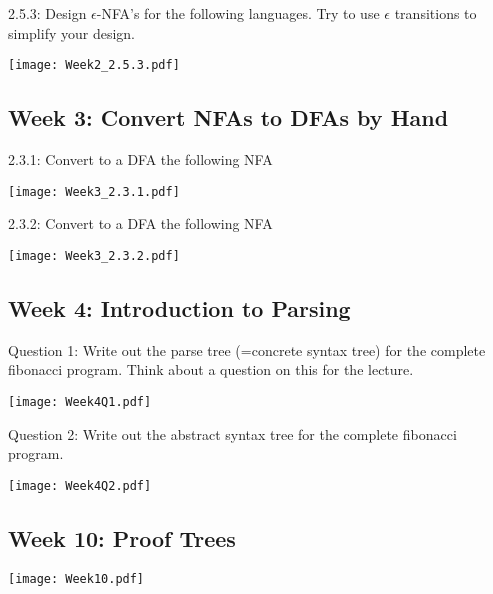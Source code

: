 \documentclass{article}
\theoremstyle{theorem}
\theoremstyle{definition}
\theoremstyle{remark}
\begin{document}
2.5.3: Design  $\epsilon$-NFA's for the following languages. Try to use $\epsilon$ transitions to simplify your design. 
\medskip\begin{center}
\texttt{[image: Week2\_2.5.3.pdf]}
\end{center}


\subsection{Week 3: Convert NFAs to DFAs by Hand}
2.3.1: Convert to a DFA the following NFA
\medskip\begin{center}
\texttt{[image: Week3\_2.3.1.pdf]}
\end{center}
2.3.2: Convert to a DFA the following NFA
\medskip\begin{center}
\texttt{[image: Week3\_2.3.2.pdf]}
\end{center}


\subsection{Week 4: Introduction to Parsing}
Question 1: Write out the parse tree (=concrete syntax tree) for the complete fibonacci program. Think about a question on this for the lecture.
\medskip\begin{center}
\texttt{[image: Week4Q1.pdf]}
\end{center}
Question 2: Write out the abstract syntax tree for the complete fibonacci program. 
\medskip\begin{center}
\texttt{[image: Week4Q2.pdf]}
\end{center}

\subsection{Week 10: Proof Trees}
\medskip\begin{center}
\texttt{[image: Week10.pdf]}
\end{center}
\end{document}
